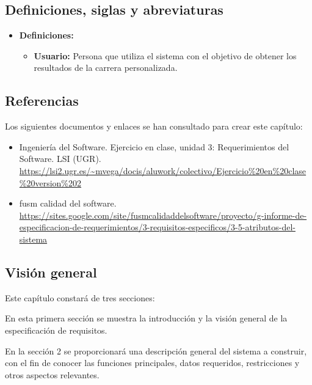 \subsection{Definiciones, siglas y abreviaturas}

\begin{itemize}
    \item \textbf{Definiciones: }
        \begin{itemize}
            \item \textbf{Usuario: }Persona que utiliza el sistema con el objetivo de obtener los resultados de la carrera personalizada.
        \end{itemize}
\end{itemize}

\subsection{Referencias}

Los siguientes documentos y enlaces se han consultado para crear este capítulo:

\begin{itemize}
    \item Ingeniería del Software. Ejercicio en clase, unidad 3: Requerimientos del Software. LSI (UGR). \url{https://lsi2.ugr.es/~mvega/docis/aluwork/colectivo/Ejercicio%20en%20clase%20version%202}
    \item fusm calidad del software. \url{https://sites.google.com/site/fusmcalidaddelsoftware/proyecto/g-informe-de-especificacion-de-requerimientos/3-requisitos-especificos/3-5-atributos-del-sistema}
\end{itemize}

\subsection{Visión general}
Este capítulo constará de tres secciones: %

\bigskip

En esta primera sección se muestra la introducción y la visión general de la especificación de requisitos.

\bigskip

En la sección 2 se proporcionará una descripción general del sistema a construir, con el fin de conocer las funciones principales, datos requeridos, restricciones y otros aspectos relevantes. 

\bigskip

